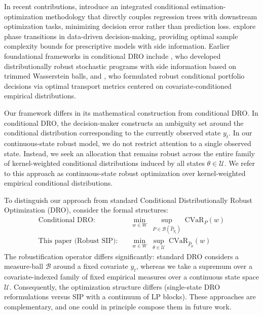 \documentclass[smallextended]{svjour3}
\begin{document}
In recent contributions, \citet{qi2025integrated} introduce an integrated conditional estimation-optimization methodology that directly couples regression trees with downstream optimization tasks, minimizing decision error rather than prediction loss. \citet{bennouna2025learning} explore phase transitions in data-driven decision-making, providing optimal sample complexity bounds for prescriptive models with side information. Earlier foundational frameworks in conditional DRO include \citet{esteban2022distributionally}, who developed distributionally robust stochastic programs with side information based on trimmed Wasserstein balls, and \citet{nguyen2021robustifying}, who formulated robust conditional portfolio decisions via optimal transport metrics centered on covariate-conditioned empirical distributions.

Our framework differs in its mathematical construction from conditional DRO. In conditional DRO, the decision-maker constructs an ambiguity set around the conditional distribution corresponding to the currently observed state $y_t$. In our continuous-state robust model, we do not restrict attention to a single observed state. Instead, we seek an allocation that remains robust across the entire family of kernel-weighted conditional distributions induced by all states $\theta \in \mathcal{U}$. We refer to this approach as continuous-state robust optimization over kernel-weighted empirical conditional distributions.


To distinguish our approach from standard Conditional Distributionally Robust Optimization (DRO), consider the formal structures:
\begin{align}
\text{Conditional DRO:} &\quad \min_{w \in W}\;\sup_{P \in \mathcal{B}(\hat{P}_{y_t})}\; \mathrm{CVaR}_{P}(w) \label{eq:dro_contrast} \\
\text{This paper (Robust SIP):} &\quad \min_{w \in W}\;\sup_{\theta \in \mathcal{U}}\; \mathrm{CVaR}_{\hat{P}_\theta}(w) \label{eq:sip_contrast}
\end{align}
The robustification operator differs significantly: standard DRO considers a measure-ball $\mathcal{B}$ around a fixed covariate $y_t$, whereas we take a supremum over a covariate-indexed family of fixed empirical measures over a continuous state space $\mathcal{U}$. Consequently, the optimization structure differs (single-state DRO reformulations versus SIP with a continuum of LP blocks). These approaches are complementary, and one could in principle compose them in future work.
\end{document}
